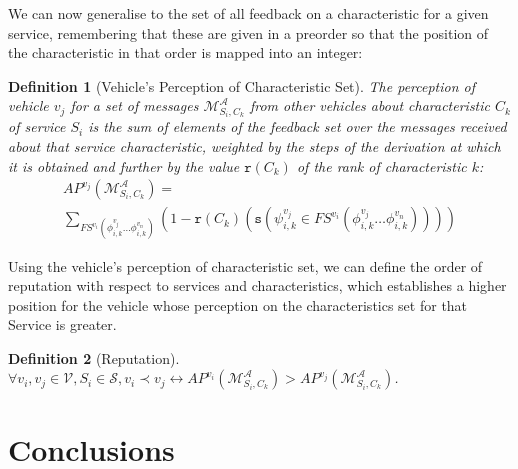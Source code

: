 \documentclass[compsoc, conference, letterpaper, 10pt, times]{IEEEtran}
\newtheorem{definition}{Definition}
\begin{document}
We can now generalise to the set of all feedback on a characteristic for a given service, remembering that these are given in a preorder so that the position of the characteristic in that order is mapped into an integer:


\begin{definition}[Vehicle's Perception of Characteristic Set]
The perception of vehicle $v_{j}$ for a set of messages $\mathcal{M}^{\mathcal{A}}_{S_{i},C_{k}}$ from other vehicles about characteristic $C_{k}$ of service $S_{i}$ is the sum of elements of the feedback set over the messages received about that service characteristic, weighted by the steps of the derivation at which it is obtained and further by the value $\mathtt{r}(C_{k})$ of the rank of characteristic $k$: 
%
\begin{displaymath}
\begin{array}{l}
AP^{v_{j}}(\mathcal{M}^{\mathcal{A}}_{S_{i}, C_{k}})=\\
\sum_{FS^{v_{i}}(\phi^{v_{j}}_{i,k}\dots \phi^{v_{n}}_{i,k})}
(1-\mathtt{r}(C_{k})(\mathtt{s}(\psi^{v_{j}}_{i,k} \in FS^{v_{i}}(\phi^{v_{j}}_{i,k}\dots \phi^{v_{n}}_{i,k}))))
\end{array}
\end{displaymath}
\end{definition}


Using the vehicle's perception of characteristic set, we can define the order of reputation with respect to services and characteristics, which establishes a higher position for the vehicle whose perception on the characteristics set for that Service is greater.

\begin{definition}[Reputation]
$\forall v_{i}, v_{j}\in \mathcal{V}, S_{i}\in \mathcal{S}, v_{i}\prec v_{j} \leftrightarrow AP^{v_{i}}(\mathcal{M}^{\mathcal{A}}_{S_{i}, C_{k}})>AP^{v_{j}}(\mathcal{M}^{\mathcal{A}}_{S_{i}, C_{k}})$.
\end{definition}

\section{Conclusions}
\end{document}

